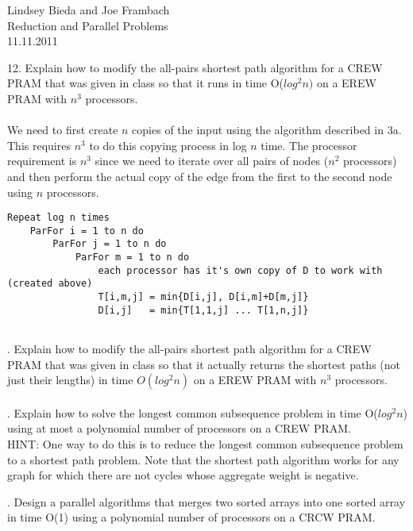 \documentclass[10pt]{article}
\begin{document}
	\begin{flushright}
	Lindsey Bieda and Joe Frambach\\
	Reduction and Parallel Problems\\
	11.11.2011
	\end{flushright}

12. Explain how to modify the all-pairs shortest path algorithm for a CREW PRAM that was given in
class so that it runs in time O($log^2n)$ on a EREW PRAM with $n^3$ processors.\\
\\
We need to first create $n$ copies of the input using the algorithm described in 3a. This requires
$n^3$ to do this copying process in log $n$ time. The processor requirement is $n^3$ since we need to 
iterate over all pairs of nodes ($n^2$ processors) and then perform the actual copy of the edge from
the first to the second node using $n$ processors.
\begin{verbatim}
Repeat log n times
    ParFor i = 1 to n do
        ParFor j = 1 to n do
            ParFor m = 1 to n do
                each processor has it's own copy of D to work with (created above)
                T[i,m,j] = min{D[i,j], D[i,m]+D[m,j]}
                D[i,j]   = min{T[1,1,j] ... T[1,n,j]}
            
\end{verbatim}  

. Explain how to modify the all-pairs shortest path algorithm for a CREW PRAM that was given in
class so that it actually returns the shortest paths (not just their lengths) in time $O(log^2 n)$ on a EREW
PRAM with $n^3$ processors.\\
\\


. Explain how to solve the longest common subsequence problem in time O($log^2n$) using at most a
polynomial number of processors on a CREW PRAM.\\
HINT: One way to do this is to reduce the longest common subsequence problem to a shortest path
problem. Note that the shortest path algorithm works for any graph for which there are not cycles
whose aggregate weight is negative.

. Design a parallel algorithms that merges two sorted arrays into one sorted array in time O(1) using a
polynomial number of processors on a CRCW PRAM.
\end{document}
